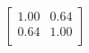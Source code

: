 \begin{equation}
\left[
\begin{array}{cc}
1.00 & 0.64 \\
0.64 & 1.00 \\
\end{array}
\right]
\end{equation}
